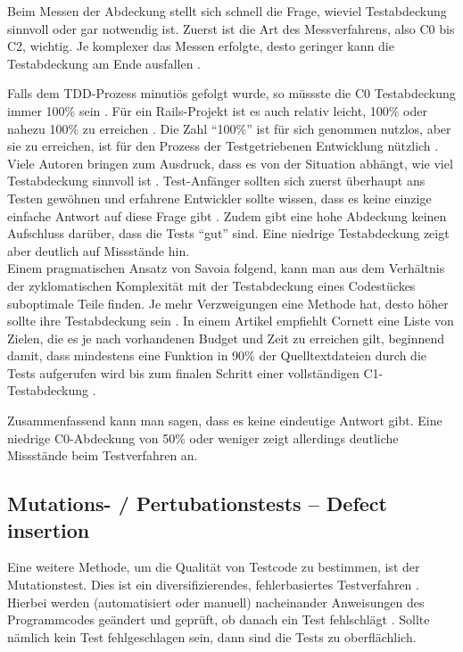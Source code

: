  Beim Messen der Abdeckung stellt sich schnell die Frage, wieviel Testabdeckung sinnvoll oder gar notwendig ist. Zuerst ist die Art des Messverfahrens, also C0 bis C2, wichtig. Je komplexer das Messen erfolgte, desto geringer kann die Testabdeckung am Ende ausfallen \citep{catherine_powell_abakas_2008}.

 Falls dem TDD-Prozess minutiös gefolgt wurde, so müssste die C0 Testabdeckung immer 100\% sein \citep{beck_test_2002}. Für ein Rails-Projekt ist es auch relativ leicht, 100\% oder nahezu 100\% zu erreichen \citep{rappin_rails_2011}. Die Zahl "`100\%"' ist für sich genommen nutzlos, aber sie zu erreichen, ist für den Prozess der Testgetriebenen Entwicklung nützlich \citep[S. 270]{rappin_rails_2011}. \\
 Viele Autoren bringen zum Ausdruck, dass es von der Situation abhängt, wie viel Testabdeckung sinnvoll ist \citep{infoq_2007}. Test-Anfänger sollten sich zuerst überhaupt ans Testen gewöhnen und erfahrene Entwickler sollte wissen, dass es keine einzige einfache Antwort auf diese Frage gibt \citep{infoq_2007}. Zudem gibt eine hohe Abdeckung keinen Aufschluss darüber, dass die Tests "`gut"' sind. Eine niedrige Testabdeckung zeigt aber deutlich auf Missstände hin.\\
 Einem pragmatischen Ansatz von Savoia folgend, kann man aus dem Verhältnis der zyklomatischen Komplexität mit der Testabdeckung eines Codestückes suboptimale Teile finden. Je mehr Verzweigungen eine Methode hat, desto höher sollte ihre Testabdeckung sein \citep{alberto_savoia_code_2007}. In einem Artikel empfiehlt Cornett eine Liste von Zielen, die es je nach vorhandenen Budget und Zeit zu erreichen gilt, beginnend damit, dass mindestens eine Funktion in 90\% der Quelltextdateien durch die Tests aufgerufen wird bis zum finalen Schritt einer vollständigen C1-Testabdeckung \citep{steve_cornett_code_1996}.

 Zusammenfassend kann man sagen, dass es keine eindeutige Antwort gibt. Eine niedrige C0-Abdeckung von 50\% oder weniger zeigt allerdings deutliche Missstände beim Testverfahren an.

 \subsection{Mutations- / Pertubationstests -- Defect insertion}
 \label{sec:mutation}
 Eine weitere Methode, um die Qualität von Testcode zu bestimmen, ist der Mutationstest. Dies ist ein diversifizierendes, fehlerbasiertes Testverfahren \citep{liggesmeyer_modultest_1990}. Hierbei werden (automatisiert oder manuell) nacheinander Anweisungen des Programmcodes geändert und geprüft, ob danach ein Test fehlschlägt \citep{beck_test_2002}. Sollte nämlich kein Test fehlgeschlagen sein, dann sind die Tests zu oberflächlich.


